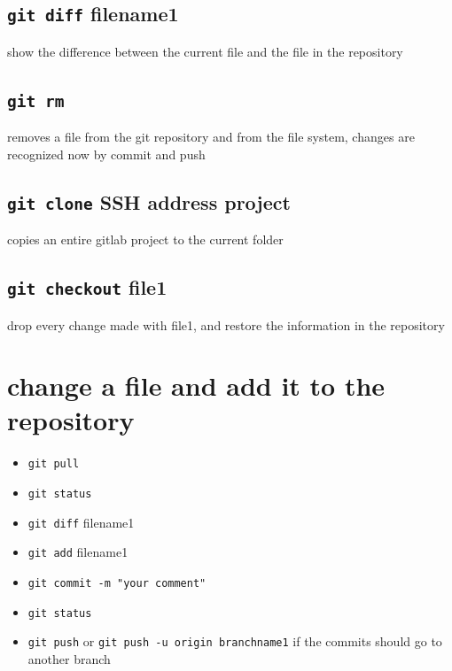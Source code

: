\documentclass[ twoside,openright,titlepage,numbers=noenddot,headinclude,%
                footinclude=true, cleardoublepage=empty,abstractoff, %
                BCOR=5mm,paper=a4,fontsize=11pt,%
                ]{scrreprt}
\begin{document}
\subsection{\texttt{git diff} filename1}
	show the difference between the current file and the file in the repository
\subsection{\texttt{git rm}}
	removes a file from the git repository and from the file system, changes are recognized now by commit and push	
\subsection{\texttt{git clone} SSH address project}
		copies an entire gitlab project to the current folder
\subsection{\texttt{git checkout} file1 }
		drop every change made with file1, and restore the information in the repository 
\section{change a file and add it to the repository }
	\begin{itemize}
		\item \texttt{git pull}
		\item \texttt{git status}
		\item \texttt{git diff} filename1
		\item \texttt{git add} filename1
		\item \texttt{git commit -m "your comment"}
		\item \texttt{git status}
		\item \texttt{git push} or \texttt{git push -u origin branchname1} if the commits should go to another branch
	\end{itemize}
\end{document}
